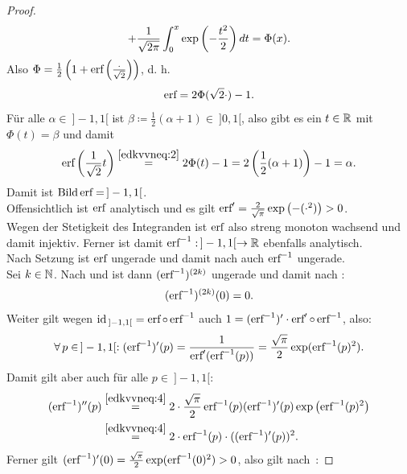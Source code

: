 \begin{proof}
\begin{align*}
+ \frac{1}{\sqrt{2\pi}}\int_0^x\exp\left(- \frac {t^2}2 \right)dt = \Phi(x)\text.
\end{align*}
Also $\Phi = \frac 1 2\left(1+\mathop{\textrm{erf}}\nolimits\left(\frac \cdot{\sqrt 2} \right)\right)$,
d. h. 
\begin{align}
\mathop{\textrm{erf}}\nolimits = 2\Phi(\sqrt 2 \cdot) - 1\text. \label{edkvvneq:2}
\end{align}
Für alle $\alpha\in\!\ ]-1,1[$ ist $\beta\coloneqq \frac 12(\alpha+1)\in\!\ ]0,1[$,
also gibt es ein $t \in \mathbb{R}$ mit $\Phi(t) = \beta$ und damit
\[\mathop{\textrm{erf}}\nolimits\left(\frac 1 {\sqrt 2}t \right) \overset{\eqref{edkvvneq:2}}= 2\Phi(t)-1
= 2\left(\frac 1 2 (\alpha +1)\right) -1 = \alpha \text.\]
Damit ist $\mathop{\textrm{Bild}}\nolimits \mathop{\textrm{erf}}\nolimits = \!\ ]-1,1[$.\\
Offensichtlich ist $\mathop{\textrm{erf}}\nolimits$ analytisch und es gilt $\mathop{\textrm{erf}}\nolimits' = \frac 2{\sqrt \pi}
\exp\left(- (\cdot^2) \right) > 0$.\\
Wegen der Stetigkeit des Integranden ist $\mathop{\textrm{erf}}\nolimits$ also streng monoton wachsend
und damit injektiv. Ferner ist damit $\erf\inv:\!\ ]-1,1[ \rightarrow \R$
ebenfalls analytisch.\\
Nach Setzung ist $\mathop{\textrm{erf}}\nolimits$ ungerade und damit nach
 auch
$\mathop{\textrm{erf}}\nolimits^{-1}$ ungerade.\\
Sei $k \in \mathbb{N}$. Nach
 und
 ist dann
$(\mathop{\textrm{erf}}\nolimits^{-1})^{(2k)}$ ungerade und damit nach
:
\begin{align}(\mathop{\textrm{erf}}\nolimits^{-1})^{(2k)}(0) = 0 \text. \label{edkvvneq:3}\end{align}
Weiter gilt wegen $\text{id}\,_{]-1,1[} = \mathop{\textrm{erf}}\nolimits \circ \mathop{\textrm{erf}}\nolimits^{-1}$ auch
$1 = (\mathop{\textrm{erf}}\nolimits^{-1})' \cdot \mathop{\textrm{erf}}\nolimits' \circ \mathop{\textrm{erf}}\nolimits^{-1}$, also:
\begin{align}
\forall\, p \in \!\ ]-1,1[: (\mathop{\textrm{erf}}\nolimits^{-1})'(p) = \frac 1 {\mathop{\textrm{erf}}\nolimits' ( \mathop{\textrm{erf}}\nolimits ^{-1}(p))} 
=\frac {\sqrt \pi}2 \exp(\mathop{\textrm{erf}}\nolimits^{-1}(p)^2)\text. \label{edkvvneq:4}
\end{align}
Damit gilt aber auch für alle $p \in\!\  ]-1,1[$:
\begin{align*}(\mathop{\textrm{erf}}\nolimits^{-1})''(p) &\overset{\eqref{edkvvneq:4}}=
2\cdot\frac{\sqrt \pi}2 \mathop{\textrm{erf}}\nolimits^{-1}(p)(\mathop{\textrm{erf}}\nolimits^{-1})'(p)
\exp\left(\mathop{\textrm{erf}}\nolimits^{-1}(p)^2\right)\\
&\overset{\eqref{edkvvneq:4}} = 
2\cdot\mathop{\textrm{erf}}\nolimits^{-1}(p)\cdot ((\mathop{\textrm{erf}}\nolimits^{-1})'(p))^2\text.\end{align*}
Ferner gilt $(\mathop{\textrm{erf}}\nolimits^{-1})'(0)= \frac {\sqrt\pi}2 \exp(\mathop{\textrm{erf}}\nolimits^{-1}(0)^2) > 0$, also
gilt nach~:

\end{proof}
